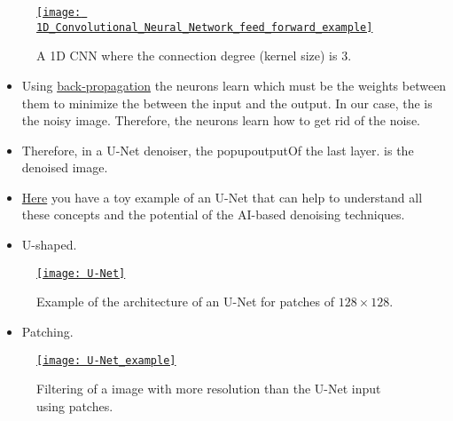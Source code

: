 \begin{figure}[H]
  \vspace{0ex}
  \centering
  \href{https://en.wikipedia.org/wiki/Convolutional_neural_network#/media/File:1D_Convolutional_Neural_Network_feed_forward_example.png}{\texttt{[image: 1D\_Convolutional\_Neural\_Network\_feed\_forward\_example]}}
  \caption{A 1D \gls{CNN} where the connection degree (kernel size) is 3.}
  \label{fig:a_CNN}
\end{figure}

\begin{itemize}
\item Using
  \href{https://en.wikipedia.org/wiki/Backpropagation}{back-propagation}
  the neurons learn which must be the weights between them to
  minimize the  between the input and the output. In our
  case, the  is the noisy image. Therefore, the neurons learn how to
  get rid of the noise.
\item Therefore, in a U-Net denoiser, the popup{output}{Of the last
  layer.}  is the denoised image.
\item
  \href{https://github.com/vicente-gonzalez-ruiz/medical_imaging/blob/main/notebooks/U_Net.ipynb}{Here}
  you have a toy example of an U-Net that can help to understand all
  these concepts and the potential of the \gls{AI}-based denoising
  techniques.
\end{itemize}

\begin{itemize}
\item U-shaped.
\end{itemize}

\begin{figure}[H]
  \vspace{0ex}
  \centering
      \href{https://www.linkedin.com/pulse/14-coding-u-net-architecture-from-scratch-riya-chhikara-xbvte}{\texttt{[image: U-Net]}}
  \caption{Example of the architecture of an U-Net for patches of $128\times 128$.}
  \label{fig:UNet}
\end{figure}

\begin{itemize}
\item Patching.
\end{itemize}

\begin{figure}[H]
  \vspace{0ex}
  \centering
      \href{https://www.linkedin.com/pulse/attention-guided-u-net-model-improved-residual-blocks-gokmen}{\texttt{[image: U-Net\_example]}}
  \caption[Patching with an U-Net.]{Filtering of a image with more resolution than the U-Net input using patches.}
  \label{fig:patching}
\end{figure}
